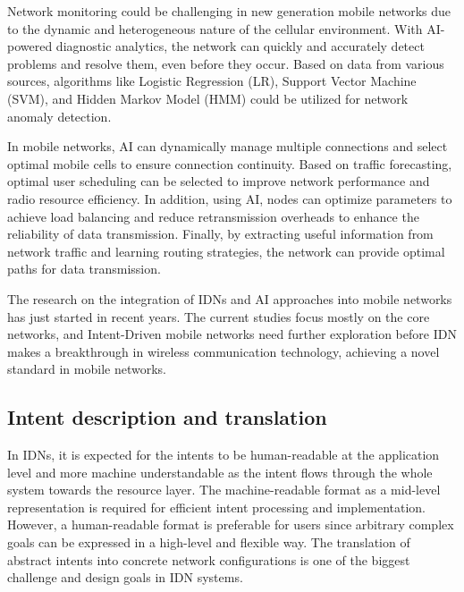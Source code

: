 Network monitoring could be challenging in new generation mobile networks due to the dynamic and heterogeneous nature of the cellular environment. With AI-powered diagnostic analytics, the network can quickly and accurately detect problems and resolve them, even before they occur. Based on data from various sources, algorithms like Logistic Regression (LR), Support Vector Machine (SVM), and Hidden Markov Model (HMM) could be utilized for network anomaly detection. \cite{anuradha2017empowering}

In mobile networks, AI can dynamically manage multiple connections and select optimal mobile cells to ensure connection continuity. Based on traffic forecasting, optimal user scheduling can be selected to improve network performance and radio resource efficiency. In addition, using AI, nodes can optimize parameters to achieve load balancing and reduce retransmission overheads to enhance the reliability of data transmission. Finally, by extracting useful information from network traffic and learning routing strategies, the network can provide optimal paths for data transmission. \cite{Zhang2019}

The research on the integration of IDNs and AI approaches into mobile networks has just started in recent years. The current studies focus mostly on the core networks, and Intent-Driven mobile networks need further exploration before IDN makes a breakthrough in wireless communication technology, achieving a novel standard in mobile networks.


\subsection{Intent description and translation}
In IDNs, it is expected for the intents to be human-readable at the application level and more machine understandable as the intent flows through the whole system towards the resource layer. The machine-readable format as a mid-level representation is required for efficient intent processing and implementation. However, a human-readable format is preferable for users since arbitrary complex goals can be expressed in a high-level and flexible way. The translation of abstract intents into concrete network configurations is one of the biggest challenge and design goals in IDN systems.

